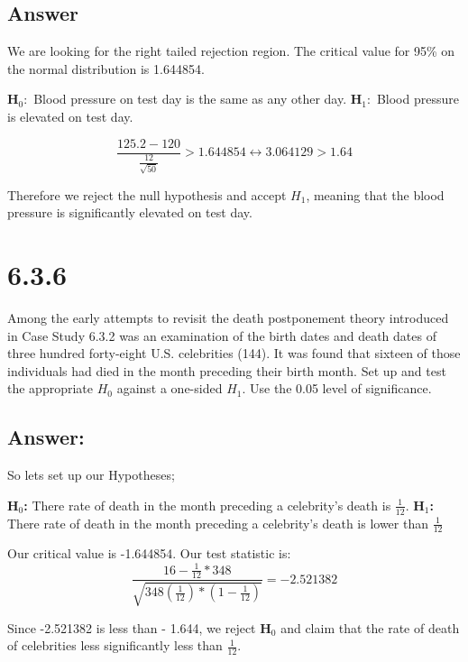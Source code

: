 \documentclass[svgnames]{article}
\begin{document}
\subsection{Answer}
We are looking for the right tailed rejection region. The critical value for 95\% on the normal distribution is 1.644854.

\begin{center}
\textbf{H$_0:$} Blood pressure on test day is the same as any other day. 
\newline
\textbf{H$_1:$} Blood pressure is elevated on test day. 
\end{center}
 $$\frac{125.2-120}{\frac{12}{\sqrt{50}}}> 1.644854 \leftrightarrow 3.064129 > 1.64 $$
 
 Therefore we reject the null hypothesis and accept $H_1$, meaning that the blood pressure is significantly elevated on test day. 

\section{6.3.6}
Among the early attempts to revisit the death postponement theory introduced in Case Study 6.3.2 was an examination of the birth dates and death dates of three hundred forty-eight U.S. celebrities (144). It was found that sixteen of those individuals had died in the month preceding their birth month. Set up and test the appropriate $H_0$ against a one-sided $H_1$. Use the 0.05 level of significance.

\subsection*{Answer:}

So lets set up our Hypotheses;
\begin{center}
\textbf{H$_0$:} There rate of death in the month preceding a celebrity's death is $\frac{1}{12}$.
\newline
\textbf{H$_1$:} There rate of death in the month preceding a celebrity's death is lower than $\frac{1}{12}$
\end{center}

Our critical value is -1.644854.
\newline
Our test statistic is:
$$ \frac{16-\frac{1}{12}*348}{\sqrt{348(\frac{1}{12})*(1-\frac{1}{12})}}=-2.521382$$

Since -2.521382 is less than - 1.644, we reject \textbf{H$_0$} and claim that the rate of death of celebrities less significantly less than $\frac{1}{12}$.
\end{document}
